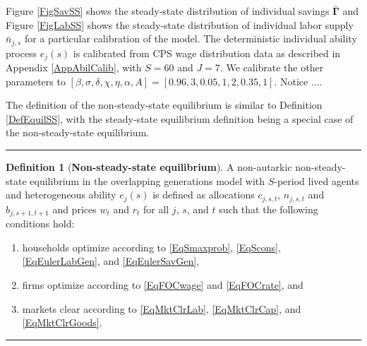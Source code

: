 \documentclass[letterpaper,12pt]{article}
\theoremstyle{definition}
\newtheorem{definition}{Definition} %
\begin{document}
\begin{spacing}{1.5}
    Figure \ref{FigSavSS} shows the steady-state distribution of individual savings $\bar{\bm{\Gamma}}$ and Figure \ref{FigLabSS} shows the steady-state distribution of individual labor supply $\bar{n}_{j,s}$ for a particular calibration of the model. The deterministic individual ability process $e_j(s)$ is calibrated from CPS wage distribution data as described in Appendix \ref{AppAbilCalib}, with $S=60$ and $J=7$. We calibrate the other parameters to $[\beta,\sigma,\delta,\chi,\eta,\alpha,A] = [0.96,3,0.05,1,2,0.35,1]$. Notice .... %

    The definition of the non-steady-state equilibrium is similar to Definition \ref{DefEquilSS}, with the steady-state equilibrium definition being a special case of the non-steady-state equilibrium.

    \vspace{7mm}
    \end{spacing}
    \hrule
    \begin{definition}[\textbf{Non-steady-state equilibrium}]\label{DefEquilNonSS}
      A non-autarkic non-steady-state equilibrium in the overlapping generations model with $S$-period lived agents and heterogeneous ability $e_j(s)$ is defined as allocations $c_{j,s,t}$, $n_{j,s,t}$ and $b_{j,s+1,t+1}$ and prices $w_t$ and $r_t$ for all $j$, $s$, and $t$ such that the following conditions hold:
       \begin{enumerate}
          \item households optimize according to \eqref{EqSmaxprob}, \eqref{EqScons}, \eqref{EqEulerLabGen}, and \eqref{EqEulerSavGen},
          \item firms optimize according to \eqref{EqFOCwage} and \eqref{EqFOCrate}, and
          \item markets clear according to \eqref{EqMktClrLab}, \eqref{EqMktClrCap}, and \eqref{EqMktClrGoods}.
       \end{enumerate}
    \end{definition}
    \hrule
\end{document}
